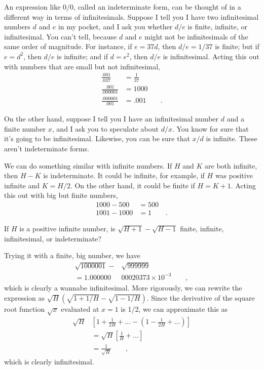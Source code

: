 An expression like $0/0$, called an indeterminate form,
can be thought of in a different way in terms of
infinitesimals. Suppose I tell you I have two infinitesimal numbers $d$ and $e$ in my
pocket, and I ask you whether $d/e$ is finite, infinite, or infinitesimal.
You can't tell, because $d$ and $e$ might not be infinitesimals of the same order of
magnitude. For instance, if $e=37d$, then $d/e=1/37$ is finite; but if
$e=d^2$, then $d/e$ is infinite; and if $d=e^2$, then $d/e$ is infinitesimal.
Acting this out with numbers that are small but not infinitesimal,
\begin{align*}
  \frac{.001}{.037} &= \frac{1}{37} \\
  \frac{.001}{.000001} &= 1000 \\
  \frac{.000001}{.001} &= .001 \qquad.
\end{align*}

On the other hand, suppose I tell you I have an infinitesimal number $d$ and a
finite number $x$, and I ask you to speculate about $d/x$. You know for sure
that it's going to be infinitesimal. Likewise, you can be sure that $x/d$ is
infinite. These aren't indeterminate forms.

We can do something similar with infinite numbers. If $H$ and $K$ are both
infinite, then $H-K$ is indeterminate. It could be infinite, for example, if
$H$ was positive infinite and $K=H/2$. On the other hand, it could be finite
if $H=K+1$. Acting this out with big but finite numbers,
\begin{align*}
  1000-500 &= 500 \\
  1001-1000 &= 1 \qquad .
\end{align*}

\begin{eg}
\egquestion If $H$ is a positive infinite number, is $\sqrt{H+1}-\sqrt{H-1}$
finite, infinite, infinitesimal, or indeterminate?

\eganswer Trying it with a finite, big number, we have
\begin{align*}
  \sqrt{1000001}-&\sqrt{999999} \\
    = 1.000000&00020373\times 10^{-3} \qquad ,
\end{align*}
which is clearly a wannabe infinitesimal. More rigorously, we can rewrite
the expression as $\sqrt{H}(\sqrt{1+1/H}-\sqrt{1-1/H})$. Since the derivative
of the square root function $\sqrt{x}$ evaluated at $x=1$ is 1/2, we can
approximate this as
\begin{align*}
  \sqrt{H}&\left[1+\frac{1}{2H}+\ldots-\left(1-\frac{1}{2H}+\ldots\right)\right] \\
    &= \sqrt{H}\left[\frac{1}{H}+\ldots\right] \\
    &= \frac{1}{\sqrt{H}} \qquad ,
\end{align*}
which is clearly infinitesimal.
\end{eg}

